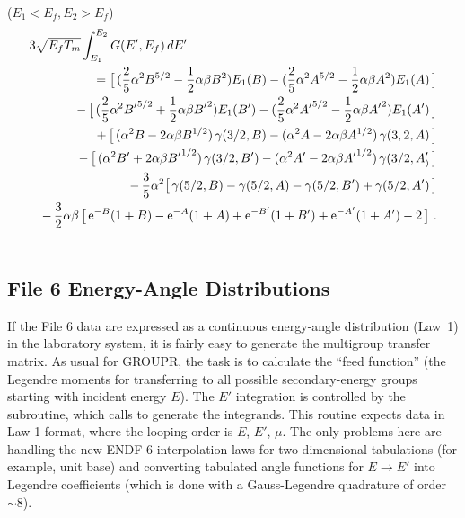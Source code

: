 \noindent{}  ($E_1 < E_f, E_2 > E_f$)
\begin{eqnarray}
  \lefteqn{3\sqrt{E_fT_m} \int_{E_1}^{E_2} G(E',E_f)\,dE'}\nonumber\\
  & & =\bigl[\, ({2\over 5}\alpha^2 B^{5/2}-{1\over 2}\alpha\beta B^2)E_1(B)
      -({2\over 5}\alpha^2 A^{5/2}-{1\over 2}\alpha\beta A^2)E_1(A)
      \,\bigr]\nonumber\\
  & & -\,\bigl[\,({2\over 5}\alpha^2 {B'}^{5/2}+{1\over 2}\alpha\beta {B'}^2)
      E_1(B') -({2\over 5}\alpha^2 {A'}^{5/2}-{1\over 2}\alpha\beta
      {A'}^2)E_1(A')\,\bigr]\nonumber\\
  & & +\,\bigl[\, (\alpha^2 B-2\alpha\beta B^{1/2})\,\gamma(3/2,B)
      -(\alpha^2 A-2\alpha\beta A^{1/2})\,\gamma(3,2,A)\,\bigr]
      \nonumber\\
  & & -\,\bigl[\, (\alpha^2 B'+2\alpha\beta {B'}^{1/2})\,\gamma(3/2,B')
      -(\alpha^2 A'-2\alpha\beta {A'}^{1/2})\,\gamma(3/2,A'_)\,\bigr]
      \nonumber\\
  & & -\,{3\over 5}\alpha^2\bigl[\,\gamma(5/2,B)-\gamma(5/2,A)
      -\gamma(5/2,B')+\gamma(5/2,A')\,\bigr]
      \nonumber\\
  & & -\,{3\over 2}\alpha\beta\,\bigl[\,{\rm e}^{-B}(1+B)-{\rm e}^{-A}(1+A)
      +{\rm e}^{-B'}(1+B')+{\rm e}^{-A'}(1+A')-2 \,\bigr]\,\,.
      \nonumber\\
  & & \mbox{ }
  \label{Eq115}
\end{eqnarray}
\normalsize

\subsection{File 6 Energy-Angle Distributions}
\label{ssGROUPR_F6_EA}

If the File 6 data are expressed as a continuous energy-angle distribution
(Law~1) in the laboratory system, it is fairly easy to generate the
multigroup transfer matrix.  As usual for GROUPR, the task is to calculate
the ``feed function'' (the Legendre moments for transferring to
all possible secondary-energy groups starting with incident energy $E$).
The $E'$ integration is controlled by the
 subroutine, which calls
 to generate the integrands.
This routine expects data in Law-1 format, where the looping order
is $E$, $E'$, $\mu$.  The only problems here are handling the new
ENDF-6 interpolation laws for two-dimensional tabulations (for
example, unit base) and converting tabulated angle functions for
$E{\rightarrow}E'$ into Legendre coefficients (which is done with
a Gauss-Legendre quadrature of order $\sim8$).

